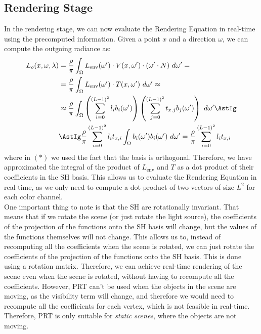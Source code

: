 \subsection{Rendering Stage}

In the rendering stage, we can now evaluate the Rendering Equation in real-time using the precomputed information. Given a point $x$ and a direction $\omega$, we can compute the outgoing radiance as:
\begin{align*}
    L_o(x, \omega, \lambda) &=  \frac{\rho}{\pi} \int_{\Omega} L_{\text{env}}(\omega')\cdot V(x, \omega') \cdot (\omega' \cdot N)\ d\omega'
    =\\&=  \frac{\rho}{\pi} \int_{\Omega} L_{\text{env}}(\omega')\cdot T(x, \omega')\ d\omega'
    \approx\\&\approx  \frac{\rho}{\pi} \int_{\Omega} \left( \sum_{i=0}^{(L-1)^2} l_i b_i(\omega') \right) \left( \sum_{j=0}^{(L-1)^2} t_{x,j} b_j(\omega') \right) \ d\omega'
    \AstIg\\&\AstIg  \frac{\rho}{\pi} \sum_{i=0}^{(L-1)^2} l_i t_{x,i} \int_{\Omega} b_i(\omega') b_i(\omega') \ d\omega'
    =   \frac{\rho}{\pi} \sum_{i=0}^{(L-1)^2} l_i t_{x,i}
\end{align*}
where in $(\ast)$ we used the fact that the basis is orthogonal. Therefore, we have approximated the integral of the product of $L_{\text{env}}$ and $T$ as a dot product of their coefficients in the SH basis. This allows us to evaluate the Rendering Equation in real-time, as we only need to compute a dot product of two vectors of size $L^2$ for each color channel.\\

One important thing to note is that the SH are rotationally invariant. That means that if we rotate the scene (or just rotate the light source), the coefficients of the projection of the functions onto the SH basis will change, but the values of the functions themselves will not change. This allows us to, instead of recomputing all the coefficients when the scene is rotated, we can just rotate the coefficients of the projection of the functions onto the SH basis. This is done using a rotation matrix. Therefore, we can achieve real-time rendering of the scene even when the scene is rotated, without having to recompute all the coefficients. However, PRT can't be used when the objects in the scene are moving, as the visibility term will change, and therefore we would need to recompute all the coefficients for each vertex, which is not feasible in real-time. Therefore, PRT is only suitable for \emph{static scenes}, where the objects are not moving.